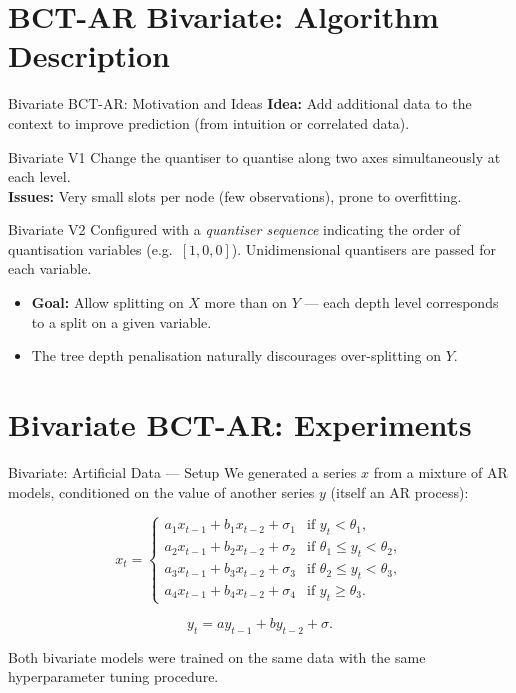 \documentclass[10pt]{beamer}
\begin{document}
\section{BCT-AR Bivariate: Algorithm Description}

\begin{frame}{Bivariate BCT-AR: Motivation and Ideas}
\textbf{Idea:} Add additional data to the context to improve prediction (from intuition or correlated data).

\begin{block}{Bivariate V1}
Change the quantiser to quantise along two axes simultaneously at each level.\\
\textbf{Issues:} Very small slots per node (few observations), prone to overfitting.
\end{block}

\begin{block}{Bivariate V2}
Configured with a \emph{quantiser sequence} indicating the order of quantisation variables (e.g.\ $[1, 0, 0]$). Unidimensional quantisers are passed for each variable.
\begin{itemize}
    \item \textbf{Goal:} Allow splitting on $X$ more than on $Y$ --- each depth level corresponds to a split on a given variable.
    \item The tree depth penalisation naturally discourages over-splitting on $Y$.
\end{itemize}
\end{block}
\end{frame}

\section{Bivariate BCT-AR: Experiments}

\begin{frame}{Bivariate: Artificial Data --- Setup}
We generated a series $x$ from a mixture of AR models, conditioned on the value of another series $y$ (itself an AR process):

\begin{equation}
x_t =
\begin{cases}
a_1 x_{t-1} + b_1 x_{t-2} + \sigma_1 & \text{if } y_t < \theta_1, \\
a_2 x_{t-1} + b_2 x_{t-2} + \sigma_2 & \text{if } \theta_1 \le y_t < \theta_2, \\
a_3 x_{t-1} + b_3 x_{t-2} + \sigma_3 & \text{if } \theta_2 \le y_t < \theta_3, \\
a_4 x_{t-1} + b_4 x_{t-2} + \sigma_4 & \text{if } y_t \ge \theta_3.
\end{cases}
\end{equation}

\[
y_t = a y_{t-1} + b y_{t-2} + \sigma.
\]

Both bivariate models were trained on the same data with the same hyperparameter tuning procedure.
\end{frame}
\end{document}
